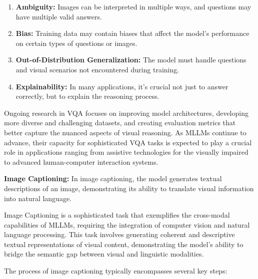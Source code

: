 \begin{enumerate}
    \item \textbf{Ambiguity:} Images can be interpreted in multiple ways, and questions may have multiple valid answers.
    \item \textbf{Bias:} Training data may contain biases that affect the model's performance on certain types of questions or images.
    \item \textbf{Out-of-Distribution Generalization:} The model must handle questions and visual scenarios not encountered during training.
    \item \textbf{Explainability:} In many applications, it's crucial not just to answer correctly, but to explain the reasoning process.
\end{enumerate}


Ongoing research in VQA focuses on improving model architectures, developing more diverse and challenging datasets, and creating evaluation metrics that better capture the nuanced aspects of visual reasoning. As MLLMs continue to advance, their capacity for sophisticated VQA tasks is expected to play a crucial role in applications ranging from assistive technologies for the visually impaired to advanced human-computer interaction systems.

\textbf{Image Captioning:} In image captioning, the model generates textual descriptions of an image, demonstrating its ability to translate visual information into natural language.

Image Captioning is a sophisticated task that exemplifies the cross-modal capabilities of MLLMs, requiring the integration of computer vision and natural language processing. This task involves generating coherent and descriptive textual representations of visual content, demonstrating the model's ability to bridge the semantic gap between visual and linguistic modalities.

The process of image captioning typically encompasses several key steps:

